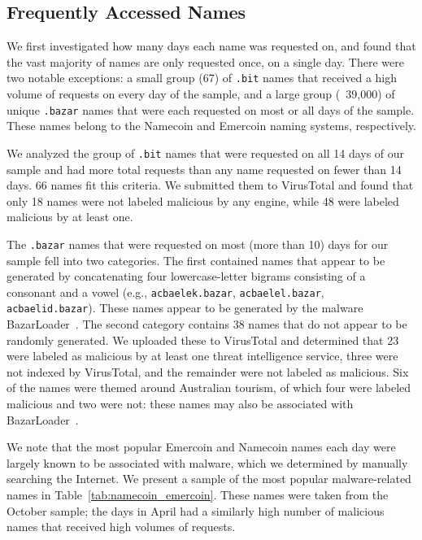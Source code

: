 \subsection{Frequently Accessed Names}

We first investigated how many days each name was requested on, and found that 
the vast majority of names are only requested once, on a single day. There were 
two notable exceptions: a small group (67) of \texttt{.bit} names that received 
a high volume of requests on every day of the sample, and a large group 
(~39,000) of unique \texttt{.bazar} names that 
were each requested on most or all days of the sample. These 
names belong to the Namecoin and Emercoin naming systems, 
respectively.

We analyzed the group of \texttt{.bit} names that were 
requested on all 14 days of our 
sample and had more total requests than any name requested on fewer than 14 
days. 66 names fit this criteria. We submitted them to VirusTotal and found 
that only 18 names were not labeled malicious by any engine, while 48 were 
labeled malicious by at least one. 

The \texttt{.bazar} names that were requested on most (more 
than 10) 
days for our sample 
fell into two categories. The first 
contained names that appear to be generated by concatenating 
four 
lowercase-letter bigrams consisting of a consonant and a vowel (e.g., 
\texttt{acbaelek.bazar}, \texttt{acbaelel.bazar}, \texttt{acbaelid.bazar}). 
These names appear to be 
generated by the 
malware BazarLoader~\cite{bazarloader_dga}. The second category contains 38 
names that do not appear to be randomly generated. We uploaded these to 
VirusTotal and determined that 23 were labeled as malicious by at least one 
threat intelligence service, three were not indexed by VirusTotal, and the 
remainder were not labeled as malicious. Six of the names were themed around 
Australian tourism, of which four were labeled malicious and two were not: 
these names may also be associated with 
BazarLoader~\cite{alienvault_bazarloader}. 

We note that the most popular Emercoin and Namecoin names each day were largely 
known to be associated with malware, which we determined by manually searching 
the Internet. We present a sample of the most popular malware-related names in 
Table~\ref{tab:namecoin_emercoin}. These names were 
taken from the October sample; the days in April had a similarly high number of 
malicious names that received high volumes of requests. 

